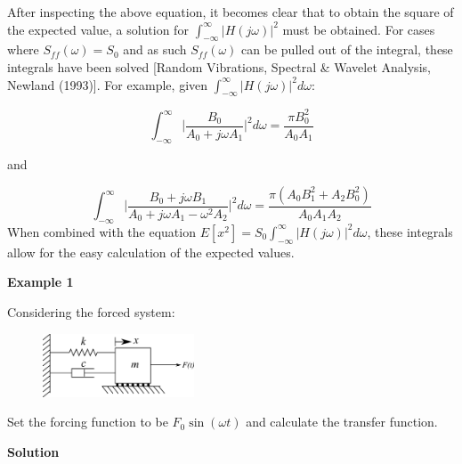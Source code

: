 \documentclass[12pt,a4paper]{article}
\begin{document}
After inspecting the above equation, it becomes clear that to obtain the square of the expected value, a solution for  $\int_{-\infty}^{\infty} |H(j\omega)|^2$ must be obtained. For cases where $S_{ff}(\omega) = S_0$ and as such $S_{ff}(\omega)$ can be pulled out of the integral, these integrals have been solved [Random Vibrations, Spectral \& Wavelet Analysis, Newland (1993)]. For example, given $\int_{-\infty}^{\infty} |H(j\omega)|^2 d\omega$:

\begin{equation}
\int_{-\infty}^{\infty} \bigg|\frac{B_0}{A_0+j \omega A_1} \bigg|^2 d\omega = \frac{\pi B_0^2}{A_0 A_1}
\end{equation} 

and

\begin{equation}
\int_{-\infty}^{\infty} \bigg|\frac{B_0 + j \omega B_1}{A_0+j \omega A_1 - \omega^2 A_2} \bigg|^2 d\omega = \frac{\pi (A_0 B_1^2 + A_2 B_0^2)}{A_0 A_1 A_2}
\end{equation} 
When combined with the equation $E[x^2] = S_{0} \int_{-\infty}^{\infty} |H(j\omega)|^2 d\omega$, these integrals allow for the easy calculation of the expected values. 

\textbf{Example 1}

Considering the forced system:
\begin{figure}[H]
	\centering
	\includegraphics[width=0.4\textwidth]{../../Figures/forced_spring_mass_damper_system.png}
\end{figure}
Set the forcing function to be $F_0 \sin(\omega t)$ and calculate the transfer function. 

\textbf{Solution}
\end{document}
